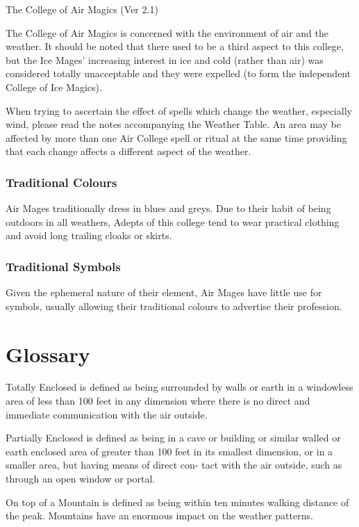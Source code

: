 \begin{Chapter}{The College of Air Magics (Ver 2.1)}

The College of Air Magics is concerned with the environment of air and
the weather.  It should be noted that there used to be a third aspect
to this college, but the Ice Mages’ increasing interest in ice and
cold (rather than air) was considered totally unacceptable and they
were expelled (to form the independent College of Ice Magics).

When trying to ascertain the effect of spells which change the
weather, especially wind, please read the notes accompanying the
Weather Table.  An area may be affected by more than one Air College
spell or ritual at the same time providing that each change affects a
different aspect of the weather.

\subsubsection{Traditional Colours}

Air Mages traditionally dress in blues and greys.  Due to their habit
of being outdoors in all weathers, Adepts of this college tend to wear
practical clothing and avoid long trailing cloaks or skirts.

\subsubsection{Traditional Symbols}

Given the ephemeral nature of their element, Air Mages have little use
for symbols, usually allowing their traditional colours to advertise
their profession.

\section{Glossary}

Totally Enclosed is defined as being surrounded by walls or earth in a
windowless area of less than 100 feet in any dimension where there is
no direct and immediate communication with the air outside.

Partially Enclosed is defined as being in a cave or building or
similar walled or earth enclosed area of greater than 100 feet in its
smallest dimension, or in a smaller area, but having means of direct
con- tact with the air outside, such as through an open window or
portal.

On top of a Mountain is defined as being within ten 
minutes  walking  distance  of  the  peak.  Mountains 
have an enormous impact on the weather patterns. 


\end{Chapter}
